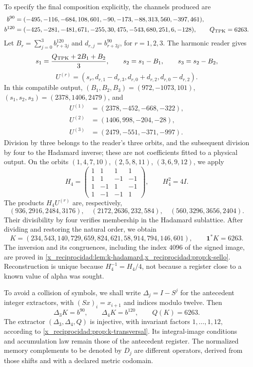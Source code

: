 To specify the final composition explicitly, the channels produced are
\begin{align*}
 b^{90}&=(-495,-116,-684,108,601,-90,
                -173,-88,313,560,-397,461),\\
 b^{120}&=(-425,-281,-481,671,-255,30,
                 475,-543,680,251,6,-128),\qquad Q_{\rm TPK}=6263.
\end{align*}
Let \(B_r=\sum_{j=0}^3b^{120}_{r+3j}\) and \(d_{r,j}=b^{90}_{r+3j}\), for \(r=1,2,3\). The harmonic reader gives
\[
 s_1=\frac{Q_{\rm TPK}+2B_1+B_2}{3},\qquad
 s_2=s_1-B_1,\qquad s_3=s_2-B_2,
\]
\[
 U^{(r)}=(s_r,d_{r,1}-d_{r,3},d_{r,0}+d_{r,2},d_{r,0}-d_{r,2}).
\]
In this compatible output, \((B_1,B_2,B_3)=(972,-1073,101)\), \((s_1,s_2,s_3)=(2378,1406,2479)\), and
\begin{align*}
 U^{(1)}&=(2378,-452,-668,-322),\\
 U^{(2)}&=(1406,998,-204,-28),\\
 U^{(3)}&=(2479,-551,-371,-997).
\end{align*}
Division by three belongs to the reader's three orbits, and the subsequent division by four to the Hadamard inverse; these are not coefficients fitted to a physical output. On the orbits \((1,4,7,10)\), \((2,5,8,11)\), \((3,6,9,12)\), we apply
\[
 H_4=\begin{pmatrix}
 1&1&1&1\\1&1&-1&-1\\1&-1&1&-1\\1&-1&-1&1
 \end{pmatrix},\qquad H_4^2=4I.
\]
The products \(H_4U^{(r)}\) are, respectively,
\[
 (936,2916,2484,3176),\quad(2172,2636,232,584),
 \quad(560,3296,3656,2404).
\]
Their divisibility by four verifies membership in the Hadamard sublattice. After dividing and restoring the natural order, we obtain
\begin{equation}
 K=(234,543,140,729,659,824,621,58,914,794,146,601),
 \qquad\mathbf1^*K=6263.
 \label{x_reciprocidad:lib01:K}
\end{equation}
The inversion and its congruences, including the index \(4096\) of the signed image, are proved in \cref{x_reciprocidad:lem:k-hadamard,x_reciprocidad:prop:k-sello}. Reconstruction is unique because \(H_4^{-1}=H_4/4\), not because a register close to a known value of alpha was sought.

To avoid a collision of symbols, we shall write \(\Delta_j=I-S^j\) for the antecedent integer extractors, with \((Sx)_i=x_{i+1}\) and indices modulo twelve. Then
\[
 \Delta_3K=b^{90},\qquad \Delta_4K=b^{120},\qquad Q(K)=6263.
\]
The extractor \((\Delta_3,\Delta_4,Q)\) is injective, with invariant factors \(1,\ldots,1,12\), according to \cref{x_reciprocidad:prop:k-transversal}. Its integral-image conditions and accumulation law remain those of the antecedent register. The normalized memory complements to be denoted by \(D_j\) are different operators, derived from those shifts and with a declared metric codomain.

